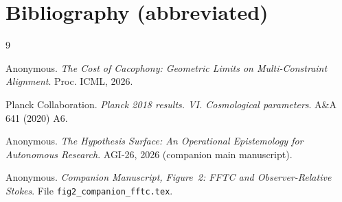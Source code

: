 \documentclass[11pt]{article}
\begin{document}
\section*{Bibliography (abbreviated)}
\label{sec:bib}

\begin{thebibliography}{9}

Anonymous.
\emph{The Cost of Cacophony: Geometric Limits on Multi-Constraint
Alignment}. Proc. ICML, 2026.

Planck Collaboration.
\emph{Planck 2018 results. VI. Cosmological parameters}. A\&A 641
(2020) A6.

Anonymous.
\emph{The Hypothesis Surface: An Operational Epistemology for
Autonomous Research}. AGI-26, 2026 (companion main manuscript).

Anonymous.
\emph{Companion Manuscript, Figure~2: FFTC and Observer-Relative
Stokes}. File \texttt{fig2\_companion\_fftc.tex}.

\end{thebibliography}
\end{document}
